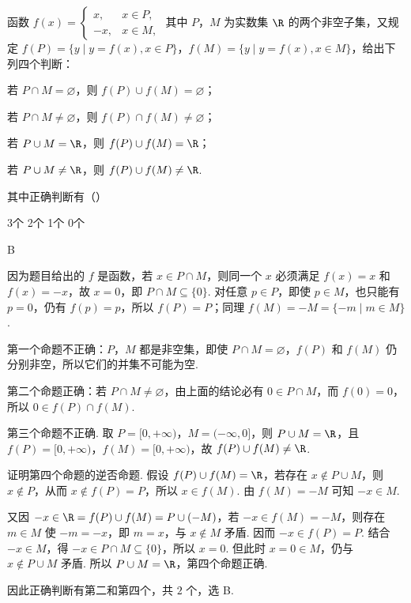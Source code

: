 \begin{problem}
函数 \(f(x)=\begin{cases}
x,&x\in P,\\
-x,&x\in M,
\end{cases}\) 其中 \(P\)，\(M\) 为实数集 \(\R\) 的两个非空子集，又规定 \(f(P)=\{y\mid y=f(x),x\in P\}\)，\(f(M)=\{y\mid y=f(x),x\in M\}\)，给出下列四个判断：

\begin{circlelist}
\item 若 \(P\cap M=\varnothing\)，则 \(f(P)\cup f(M)=\varnothing\)；
\item 若 \(P\cap M\neq\varnothing\)，则 \(f(P)\cap f(M)\neq\varnothing\)；
\item 若 \(P\cup M=\R\)，则 \(f(P)\cup f(M)=\R\)；
\item 若 \(P\cup M\neq\R\)，则 \(f(P)\cup f(M)\neq\R\).
\end{circlelist}

其中正确判断有（\quad）

\choices
    {3个}
    {2个}
    {1个}
    {0个}
\begin{answer}
B
\end{answer}

\begin{solution}
因为题目给出的 \(f\) 是函数，若 \(x\in P\cap M\)，则同一个 \(x\) 必须满足 \(f(x)=x\) 和 \(f(x)=-x\)，故 \(x=0\)，即 \(P\cap M\subseteq\{0\}\). 对任意 \(p\in P\)，即使 \(p\in M\)，也只能有 \(p=0\)，仍有 \(f(p)=p\)，所以 \(f(P)=P\)；同理 \(f(M)=-M=\{-m\mid m\in M\}\).

第一个命题不正确：\(P\)，\(M\) 都是非空集，即使 \(P\cap M=\varnothing\)，\(f(P)\) 和 \(f(M)\) 仍分别非空，所以它们的并集不可能为空.

第二个命题正确：若 \(P\cap M\neq\varnothing\)，由上面的结论必有 \(0\in P\cap M\)，而 \(f(0)=0\)，所以 \(0\in f(P)\cap f(M)\).

第三个命题不正确. 取 \(P=[0,+\infty)\)，\(M=(-\infty,0]\)，则 \(P\cup M=\R\)，且
\(f(P)=[0,+\infty)\)，\(f(M)=[0,+\infty)\)，故 \(f(P)\cup f(M)\neq\R\).

证明第四个命题的逆否命题. 假设 \(f(P)\cup f(M)=\R\)，若存在 \(x\notin P\cup M\)，则 \(x\notin P\)，从而 \(x\notin f(P)=P\)，所以 \(x\in f(M)\). 由 \(f(M)=-M\) 可知 \(-x\in M\).

又因 \(-x\in\R=f(P)\cup f(M)=P\cup(-M)\)，若 \(-x\in f(M)=-M\)，则存在 \(m\in M\) 使 \(-m=-x\)，即 \(m=x\)，与 \(x\notin M\) 矛盾. 因而 \(-x\in f(P)=P\). 结合 \(-x\in M\)，得 \(-x\in P\cap M\subseteq\{0\}\)，所以 \(x=0\). 但此时 \(x=0\in M\)，仍与 \(x\notin P\cup M\) 矛盾. 所以 \(P\cup M=\R\)，第四个命题正确.

因此正确判断有第二和第四个，共 \(2\) 个，选 B.
\end{solution}

\end{problem}

